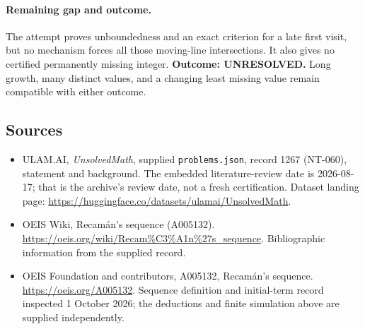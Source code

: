 \documentclass[11pt,a4paper]{article}
\begin{document}
\paragraph{Remaining gap and outcome.}
The attempt proves unboundedness and an exact criterion for a late
first visit, but no mechanism forces all those moving-line
intersections. It also gives no certified permanently missing integer.
\textbf{Outcome: UNRESOLVED.} Long growth, many distinct values, and
a changing least missing value remain compatible with either outcome.

\subsection{Sources}

{\small

\begin{itemize}

\item[\hypertarget{source:1267:1}{S1}] ULAM.AI, \emph{UnsolvedMath}, supplied \texttt{problems.json}, record 1267 (NT-060), statement and background. The embedded literature-review date is 2026-08-17; that is the archive’s review date, not a fresh certification. Dataset landing page: \url{https://huggingface.co/datasets/ulamai/UnsolvedMath}.

\item[\hypertarget{source:1267:2}{S2}] OEIS Wiki, Recamán's sequence (A005132). \url{https://oeis.org/wiki/Recam%C3%A1n%27s_sequence}. Bibliographic information from the supplied record.


\item[E1] OEIS Foundation and contributors, A005132,
Recam\'an's sequence. \url{https://oeis.org/A005132}.
Sequence definition and initial-term record inspected 1 October 2026;
the deductions and finite simulation above are supplied independently.

\end{itemize}

}

\label{end:1267}
\end{document}
